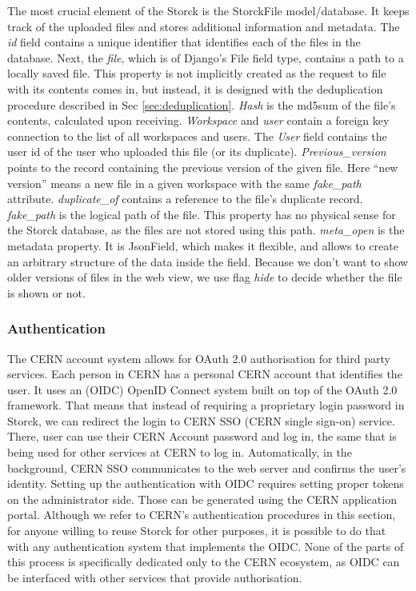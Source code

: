 The most crucial element of the Storck is the StorckFile model/database. It keeps track of the uploaded files and stores additional information and metadata.
The \textit{id} field contains a unique identifier that identifies each of the files in the database.
Next, the \textit{file}, which is of Django's File field type, contains a path to a locally saved file.
This property is not implicitly created as the request to file with its contents comes in, but instead, it is designed with the deduplication procedure described in Sec \ref{sec:deduplication}.
\textit{Hash} is the md5sum of the file's contents, calculated upon receiving.
\textit{Workspace} and \textit{user} contain a foreign key connection to the list of all workspaces and users.
The \textit{User} field contains the user id of the user who uploaded this file (or its duplicate).
\textit{Previous\_version} points to the record containing the previous version of the given file.
Here ``new version'' means a new file in a given workspace with the same \textit{fake\_path} attribute.
\textit{duplicate\_of} contains a reference to the file's duplicate record.
\textit{fake\_path} is the logical path of the file.
This property has no physical sense for the Storck database, as the files are not stored using this path.
\textit{meta\_open} is the metadata property.
It is JsonField, which makes it flexible, and allows to create an arbitrary structure of the data inside the field.
Because we don't want to show older versions of files in the web view, we use flag \textit{hide} to decide whether the file is shown or not.


\subsubsection{Authentication}
The CERN account system allows for OAuth 2.0 \cite{rfc6819} authorisation for third party services.
Each person in CERN has a personal CERN account that identifies the user.
It uses an (OIDC) OpenID Connect system built on top of the OAuth 2.0 framework.
That means that instead of requiring a proprietary login password in Storck, we can redirect the login to CERN SSO (CERN single sign-on) service.
There, user can use their CERN Account password and log in, the same that is being used for other services at CERN to log in.
Automatically, in the background, CERN SSO communicates to the web server and confirms the user's identity.
Setting up the authentication with OIDC requires setting proper tokens on the administrator side. Those can be generated using the CERN application portal.
Although we refer to CERN's authentication procedures in this section, for anyone willing to reuse Storck for other purposes, it is possible to do that with any authentication system that implements the OIDC.
None of the parts of this process is specifically dedicated only to the CERN ecosystem, as OIDC can be interfaced with other services that provide authorisation.


